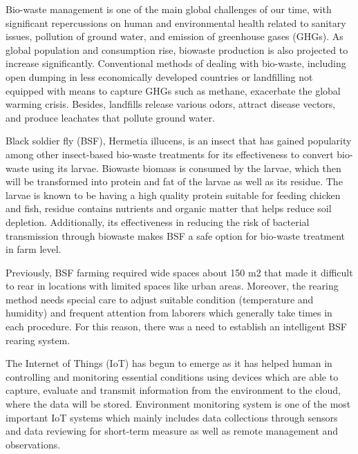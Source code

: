 \documentclass[conference]{IEEEtran}
\begin{document}
Bio-waste management is one of the main global challenges of our time, with significant
repercussions on human and environmental health related to sanitary issues, pollution of ground
water, and emission of greenhouse gases (GHGs). As global population and consumption rise, biowaste production is also projected to increase significantly. Conventional methods of dealing with
bio-waste, including open dumping in less economically developed countries or landfilling not
equipped with means to capture GHGs such as methane, exacerbate the global warming crisis.
Besides, landfills release various odors, attract disease vectors, and produce leachates that pollute
ground water.

Black soldier fly (BSF), Hermetia illucens, is an insect that has gained popularity among other
insect-based bio-waste treatments for its effectiveness to convert bio-waste using its larvae. Biowaste biomass is consumed by the larvae, which then will be transformed into protein and fat of
the larvae as well as its residue. The larvae is known to be having a high quality protein suitable
for feeding chicken and fish, residue contains nutrients and organic matter that helps reduce soil
depletion. Additionally, its effectiveness in reducing the risk of bacterial transmission through biowaste makes BSF a safe option for bio-waste treatment in farm level.

Previously, BSF farming required wide spaces about 150 m2
that made it difficult to rear in
locations with limited spaces like urban areas. Moreover, the rearing method needs special care to
adjust suitable condition (temperature and humidity) and frequent attention from laborers which
generally take times in each procedure. For this reason, there was a need to establish an intelligent
BSF rearing system.

The Internet of Things (IoT) has begun to emerge as it has helped human in controlling and
monitoring essential conditions using devices which are able to capture, evaluate and transmit
information from the environment to the cloud, where the data will be stored. Environment
monitoring system is one of the most important IoT systems which mainly includes data
collections through sensors and data reviewing for short-term measure as well as remote
management and observations.
\end{document}
